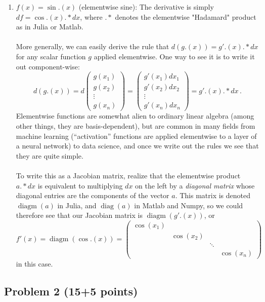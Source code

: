 \documentclass[10pt,oneside]{article}
\newcommand{\dotstar}{\mathbin{.*}}
\begin{document}
\begin{enumerate}[label=\alph*)]
    \item $f(x) = \sin.(x)$ (elementwise sine): The derivative is simply $df = \cos.(x) \dotstar dx$, where $\dotstar$ denotes the elementwise "Hadamard" product as in Julia or Matlab.  \\
    \\
    More generally, we can easily derive the rule that $d(g.(x)) = g'.(x) \dotstar dx$ for any scalar function $g$ applied elementwise.  One way to see it is to write it out component-wise: $$
    d(g.(x)) = d\begin{pmatrix} g(x_1) \\ g(x_2) \\ \vdots \\ g(x_n) \end{pmatrix} = \begin{pmatrix} g'(x_1) dx_1 \\ g'(x_2) dx_2 \\ \vdots \\ g'(x_n) dx_n \end{pmatrix}  = g'.(x) \dotstar dx \, . $$ Elementwise functions are somewhat alien to ordinary linear algebra (among other things, they are basis-dependent), but are common in many fields from machine learning (``activation'' functions are applied elementwise to a layer of a neural network) to data science, and once we write out the rules we see that they are quite simple.\\
    \\
    To write this as a Jacobian matrix, realize that the elementwise product $a \dotstar dx$ is equivalent to multiplying $dx$ on the left by a \emph{diagonal matrix} whose diagonal entries are the components of the vector $a$.  This matrix is denoted $\operatorname{diagm}(a)$ in Julia, and $\operatorname{diag}(a)$ in Matlab and Numpy, so we could therefore see that our Jacobian matrix is $\operatorname{diagm}(g'.(x))$, or
    $$
    f'(x) = \operatorname{diagm}(\cos.(x)) = \begin{pmatrix}
    \cos(x_1) & & & \\
    & \cos(x_2) & &\\
    & & \ddots & \\
    & & & \cos(x_n)
    \end{pmatrix}
    $$
    in this case.
\end{enumerate}

\pagebreak 
\subsection*{Problem 2 (15+5 points)}
\end{document}
